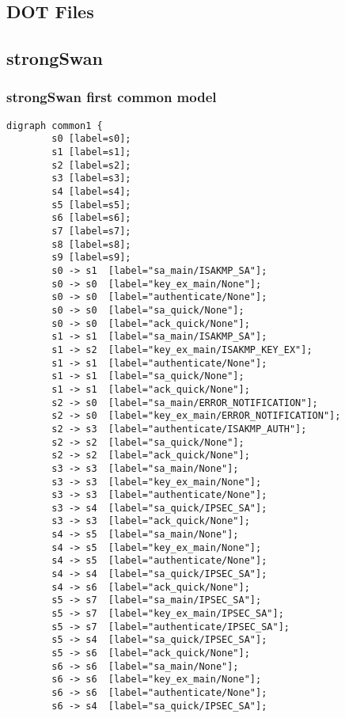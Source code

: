 \begin{appendices}

%
%
% 

\chapter{DOT Files}

\label{app::dot}
\section*{strongSwan}
\subsection*{strongSwan first common model}
\begin{lstlisting}[numbers=none]
	digraph common1 {
		s0 [label=s0];
		s1 [label=s1];
		s2 [label=s2];
		s3 [label=s3];
		s4 [label=s4];
		s5 [label=s5];
		s6 [label=s6];
		s7 [label=s7];
		s8 [label=s8];
		s9 [label=s9];
		s0 -> s1  [label="sa_main/ISAKMP_SA"];
		s0 -> s0  [label="key_ex_main/None"];
		s0 -> s0  [label="authenticate/None"];
		s0 -> s0  [label="sa_quick/None"];
		s0 -> s0  [label="ack_quick/None"];
		s1 -> s1  [label="sa_main/ISAKMP_SA"];
		s1 -> s2  [label="key_ex_main/ISAKMP_KEY_EX"];
		s1 -> s1  [label="authenticate/None"];
		s1 -> s1  [label="sa_quick/None"];
		s1 -> s1  [label="ack_quick/None"];
		s2 -> s0  [label="sa_main/ERROR_NOTIFICATION"];
		s2 -> s0  [label="key_ex_main/ERROR_NOTIFICATION"];
		s2 -> s3  [label="authenticate/ISAKMP_AUTH"];
		s2 -> s2  [label="sa_quick/None"];
		s2 -> s2  [label="ack_quick/None"];
		s3 -> s3  [label="sa_main/None"];
		s3 -> s3  [label="key_ex_main/None"];
		s3 -> s3  [label="authenticate/None"];
		s3 -> s4  [label="sa_quick/IPSEC_SA"];
		s3 -> s3  [label="ack_quick/None"];
		s4 -> s5  [label="sa_main/None"];
		s4 -> s5  [label="key_ex_main/None"];
		s4 -> s5  [label="authenticate/None"];
		s4 -> s4  [label="sa_quick/IPSEC_SA"];
		s4 -> s6  [label="ack_quick/None"];
		s5 -> s7  [label="sa_main/IPSEC_SA"];
		s5 -> s7  [label="key_ex_main/IPSEC_SA"];
		s5 -> s7  [label="authenticate/IPSEC_SA"];
		s5 -> s4  [label="sa_quick/IPSEC_SA"];
		s5 -> s6  [label="ack_quick/None"];
		s6 -> s6  [label="sa_main/None"];
		s6 -> s6  [label="key_ex_main/None"];
		s6 -> s6  [label="authenticate/None"];
		s6 -> s4  [label="sa_quick/IPSEC_SA"];

\end{lstlisting}
\end{appendices}
